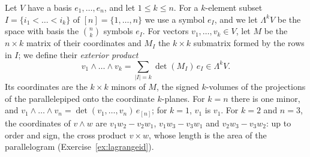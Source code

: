 Let $V$ have a basis $e_1,\dots,e_n$, and let $1\le k\le n$. For a $k$-element subset $I=\{i_1<\dots<i_k\}$ of
$[n]=\{1,\dots,n\}$ we use a symbol $e_I$, and we let $\Lambda^kV$ be the space with basis the $\binom nk$ symbols $e_I$.
For vectors $v_1,\dots,v_k\in V$, let $M$ be the $n\times k$ matrix of their coordinates and $M_I$ the $k\times k$
submatrix formed by the rows in $I$; we define their \emph{exterior product}
\[
v_1\wedge\dots\wedge v_k=\sum_{|I|=k}\det(M_I)\,e_I\in\Lambda^kV .
\]
Its coordinates are the $k\times k$ minors of $M$, the signed $k$-volumes of the projections of the parallelepiped onto
the coordinate $k$-planes. For $k=n$ there is one minor, and $v_1\wedge\dots\wedge v_n=\det(v_1,\dots,v_n)\,e_{[n]}$; for
$k=1$, $v_1$ is $v_1$. For $k=2$ and $n=3$, the coordinates of $v\wedge w$ are $v_1w_2-v_2w_1$, $v_1w_3-v_3w_1$ and
$v_2w_3-v_3w_2$: up to order and sign, the cross product $v\times w$, whose length is the area of the parallelogram
(Exercise~\ref{ex:lagrangeid}).

